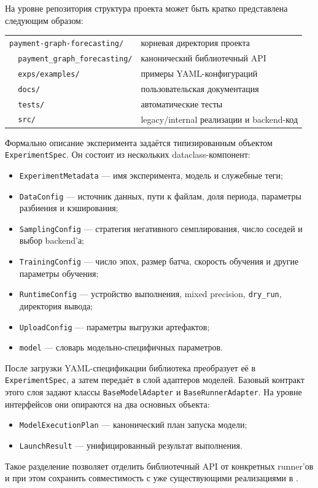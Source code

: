 \documentclass[a4paper,12pt]{extarticle}
\begin{document}
  На уровне репозитория структура проекта может быть кратко представлена следующим образом:
  \begin{center}
  \begin{tabular}{ll}
  \texttt{payment-graph-forecasting/} & корневая директория проекта \\
  \texttt{\ \ payment\_graph\_forecasting/} & канонический библиотечный API \\
  \texttt{\ \ exps/examples/} & примеры YAML-конфигураций \\
  \texttt{\ \ docs/} & пользовательская документация \\
  \texttt{\ \ tests/} & автоматические тесты \\
  \texttt{\ \ src/} & legacy/internal реализации и backend-код \\
  \end{tabular}
  \end{center}

  Формально описание эксперимента задаётся типизированным объектом \texttt{ExperimentSpec}. Он состоит из нескольких dataclass-компонент:
  \begin{itemize}
      \item \texttt{ExperimentMetadata} --- имя эксперимента, модель и служебные теги;
      \item \texttt{DataConfig} --- источник данных, пути к файлам, доля периода, параметры разбиения и кэширования;
      \item \texttt{SamplingConfig} --- стратегия негативного семплирования, число соседей и выбор backend'а;
      \item \texttt{TrainingConfig} --- число эпох, размер батча, скорость обучения и другие параметры обучения;
      \item \texttt{RuntimeConfig} --- устройство выполнения, mixed precision, \texttt{dry\_run}, директория вывода;
      \item \texttt{UploadConfig} --- параметры выгрузки артефактов;
      \item \texttt{model} --- словарь модельно-специфичных параметров.
  \end{itemize}

  После загрузки YAML-спецификации библиотека преобразует её в \texttt{ExperimentSpec}, а затем передаёт в слой адаптеров моделей. Базовый контракт этого слоя задают
  классы \texttt{BaseModelAdapter} и \texttt{BaseRunnerAdapter}. На уровне интерфейсов они опираются на два основных объекта:
  \begin{itemize}
      \item \texttt{ModelExecutionPlan} --- канонический план запуска модели;
      \item \texttt{LaunchResult} --- унифицированный результат выполнения.
  \end{itemize}
  Такое разделение позволяет отделить библиотечный API от конкретных runner'ов и при этом сохранить совместимость с уже существующими реализациями в .
\end{document}
